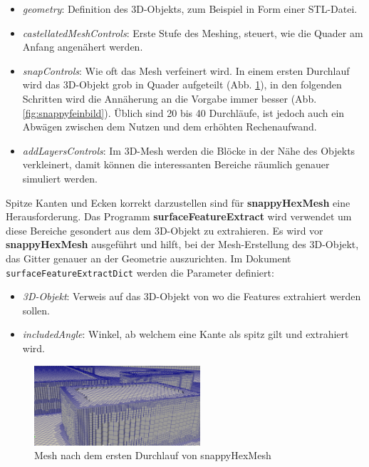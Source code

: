 \begin{itemize}
    \item \textit{geometry}: Definition des 3D-Objekts, zum Beispiel in Form einer STL-Datei.
    \item \textit{castellatedMeshControls}: Erste Stufe des Meshing, steuert, wie die Quader am Anfang angenähert werden.
    \item \textit{snapControls}: Wie oft das Mesh verfeinert wird. 
    In einem ersten Durchlauf wird das 3D-Objekt grob in Quader aufgeteilt (Abb. \ref{fig:snappygrobbild}),
    in den folgenden Schritten wird die Annäherung an die Vorgabe immer besser (Abb. \ref{fig:snappyfeinbild}).
    Üblich sind 20 bis 40 Durchläufe, ist jedoch auch ein Abwägen zwischen dem Nutzen und dem erhöhten Rechenaufwand.
    \item \textit{addLayersControls}: Im 3D-Mesh werden die Blöcke in der Nähe des Objekts verkleinert, 
    damit können die interessanten Bereiche räumlich genauer simuliert werden.
\end{itemize}
Spitze Kanten und Ecken korrekt darzustellen sind für \textbf{snappyHexMesh} eine Herausforderung.
Das Programm \textbf{surfaceFeatureExtract} wird verwendet um diese Bereiche gesondert aus dem 3D-Objekt zu extrahieren.
Es wird vor \textbf{snappyHexMesh} ausgeführt und hilft, bei der Mesh-Erstellung des 3D-Objekt, das Gitter genauer an der Geometrie auszurichten.
Im Dokument \texttt{surfaceFeatureExtractDict} werden die Parameter definiert:

\begin{itemize}
    \item \textit{3D-Objekt}: Verweis auf das 3D-Objekt von wo die Features extrahiert werden sollen.
    \item \textit{includedAngle}: Winkel, ab welchem eine Kante als spitz gilt und extrahiert wird.
\end{itemize}

\begin{figure}
    \centering
    \includegraphics[width=0.55\textwidth]{papers/openfoam/Bilder/Snappy_grob.png}
    \caption{Mesh nach dem ersten Durchlauf von snappyHexMesh}
    \label{fig:snappygrobbild}
\end{figure}

